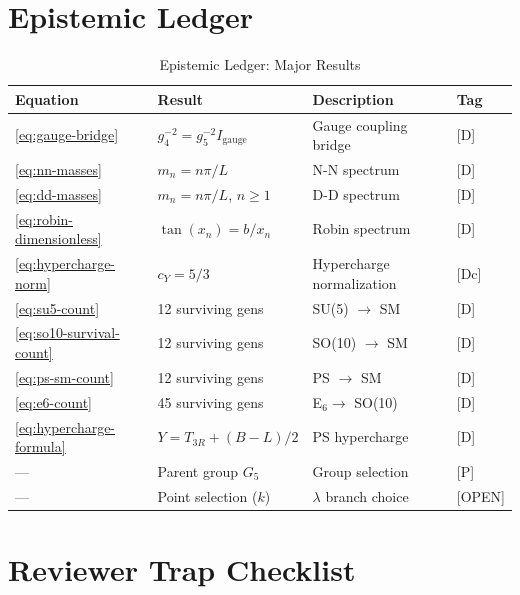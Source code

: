 \documentclass[11pt,a4paper]{article}
\begin{document}
\section{Epistemic Ledger}
\label{sec:ledger}

\begin{table}[ht]
\centering
\caption{Epistemic Ledger: Major Results}
\label{tab:ledger}
\small
\begin{tabular}{llp{6cm}l}
\toprule
Equation & Result & Description & Tag \\
\midrule
\eqref{eq:gauge-bridge} & $g_4^{-2} = g_5^{-2} I_{\text{gauge}}$ & Gauge coupling bridge & [D] \\
\eqref{eq:nn-masses} & $m_n = n\pi/L$ & N-N spectrum & [D] \\
\eqref{eq:dd-masses} & $m_n = n\pi/L$, $n \geq 1$ & D-D spectrum & [D] \\
\eqref{eq:robin-dimensionless} & $\tan(x_n) = b/x_n$ & Robin spectrum & [D] \\
\eqref{eq:hypercharge-norm} & $c_Y = 5/3$ & Hypercharge normalization & [Dc] \\
\eqref{eq:su5-count} & 12 surviving gens & SU(5) $\to$ SM & [D] \\
\eqref{eq:so10-survival-count} & 12 surviving gens & SO(10) $\to$ SM & [D] \\
\eqref{eq:ps-sm-count} & 12 surviving gens & PS $\to$ SM & [D] \\
\eqref{eq:e6-count} & 45 surviving gens & E$_6 \to$ SO(10) & [D] \\
\eqref{eq:hypercharge-formula} & $Y = T_{3R} + (B-L)/2$ & PS hypercharge & [D] \\
— & Parent group $G_5$ & Group selection & [P] \\
— & Point selection ($k$) & $\lambda$ branch choice & [OPEN] \\
\bottomrule
\end{tabular}
\end{table}

\section{Reviewer Trap Checklist}
\label{sec:traps}
\end{document}
